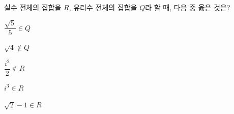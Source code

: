 실수 전체의 집합을 $R$, 유리수 전체의 집합을 $Q$라 할 때, 다음 중 옳은 것은? 
\begin{choices32}{\rule[-3ex]{0pt}{8ex}$\dfrac{\sqrt{5}}{5}\in Q$}{\rule[-3ex]{0pt}{8ex}$\sqrt{4}\notin Q$}{\rule[-3ex]{0pt}{8ex}$\dfrac{i^2}{2}\notin R$}{\rule[-3ex]{0pt}{8ex}$i^3\in R$}{\rule[-3ex]{0pt}{8ex}$\sqrt{2}-1\in R$}\end{choices32}
